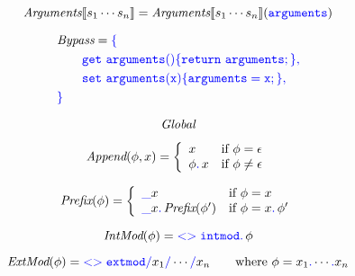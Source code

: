 \documentclass[a4paper]{article}
\newcommand{\code}[1]{\textcolor{blue}{\tt #1}}
\newcommand{\mydot}{.\,}
\newcommand{\If}{\mbox{if}}
\newcommand{\Where}{\mbox{where}}
\begin{document}
\begin{equation*}
\emph{Arguments} \llbracket s_1 \cdots s_n \rrbracket = \emph{Arguments} \llbracket s_1 \cdots s_n \rrbracket (\code{arguments})
\end{equation*}

\begin{equation*}
\begin{split}
& \emph{Bypass} = \code{\{} \\
&\qquad \code{get\ arguments() \{ return\ arguments; \},} \\
&\qquad \code{set\ arguments(x) \{ arguments = x; \},} \\
& \code{\}}
\end{split}
\end{equation*}

\begin{equation*}
\emph{Global}
\end{equation*}

\begin{equation*}
\emph{Append} (\phi, x) = \left\{\begin{array}{ll}
x & \If\ \phi = \epsilon \\
\phi \code{\mydot} x & \If\ \phi \ne \epsilon \\
\end{array}\right.
\end{equation*}

\begin{equation*}
\emph{Prefix} (\phi) = \left\{\begin{array}{ll}
\code{\_} x & \If\ \phi = x \\
\code{\_} x \code{\mydot} \emph{Prefix} (\phi') & \If\ \phi = x \code{\mydot} \phi'
\end{array}\right.
\end{equation*}

\begin{equation*}
\emph{IntMod} (\phi) = \code{<>intmod \mydot} \phi
\end{equation*}

\begin{equation*}
\emph{ExtMod} (\phi) = \code{<>extmod/} x_1 \code{/} \cdots \code{/} x_n \qquad \Where\ \phi = x_1 \code{.} \cdots \code{.} x_n
\end{equation*}
\end{document}
